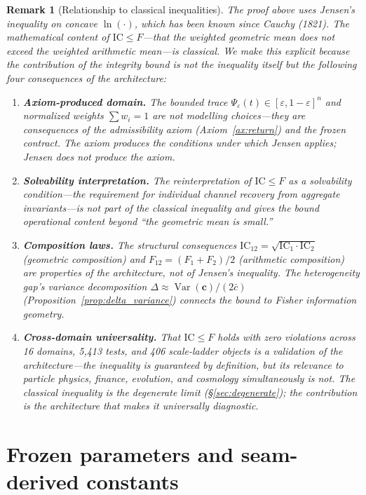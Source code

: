 \documentclass[
  aps,
  prd,
  preprint,
  superscriptaddress,
  nofootinbib,
  floatfix
]{revtex4-2}
\newcommand{\IC}{\mathrm{IC}}
\newtheorem{remark}{Remark}
\begin{document}
\begin{remark}[Relationship to classical inequalities]
\label{rem:jensen}
The proof above uses Jensen's inequality on concave $\ln(\cdot)$, which has been known since Cauchy (1821).
The mathematical content of $\IC \le F$---that the weighted geometric mean does not exceed the weighted
arithmetic mean---is classical. We make this explicit because the contribution of the integrity
bound is not the inequality itself but the following four consequences of the architecture:
\begin{enumerate}[leftmargin=2.2em]
  \item \textbf{Axiom-produced domain.}
  The bounded trace $\Psi_\varepsilon(t)\in[\varepsilon,1-\varepsilon]^n$ and normalized weights
  $\sum w_i = 1$ are not modelling choices---they are consequences of the admissibility axiom
  (Axiom~\ref{ax:return}) and the frozen contract. The axiom produces the conditions under which
  Jensen applies; Jensen does not produce the axiom.
  \item \textbf{Solvability interpretation.}
  The reinterpretation of $\IC\le F$ as a \emph{solvability condition}---the requirement for
  individual channel recovery from aggregate invariants---is not part of the classical inequality
  and gives the bound operational content beyond ``the geometric mean is small.''
  \item \textbf{Composition laws.}
  The structural consequences $\IC_{12}=\sqrt{\IC_1\cdot\IC_2}$ (geometric composition) and
  $F_{12}=(F_1+F_2)/2$ (arithmetic composition) are properties of the architecture, not of Jensen's
  inequality. The heterogeneity gap's variance decomposition
  $\Delta \approx \operatorname{Var}(\bm{c})/(2\bar{c})$ (Proposition~\ref{prop:delta_variance})
  connects the bound to Fisher information geometry.
  \item \textbf{Cross-domain universality.}
  That $\IC\le F$ holds with zero violations across 16 domains, 5{,}413 tests, and 406 scale-ladder
  objects is a validation of the architecture---the inequality is guaranteed by definition, but its
  \emph{relevance} to particle physics, finance, evolution, and cosmology simultaneously is not.
  The classical inequality is the degenerate limit (\S\ref{sec:degenerate}); the contribution is the
  architecture that makes it universally diagnostic.
\end{enumerate}
\end{remark}
\section{Frozen parameters and seam-derived constants}
\label{sec:frozen}
\end{document}
